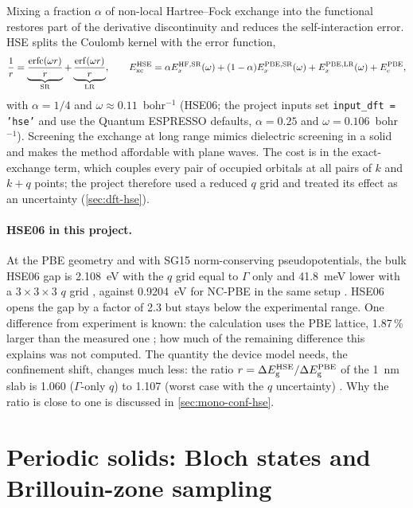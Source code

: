 Mixing a fraction $\alpha$ of non-local Hartree--Fock exchange into the functional restores part of the derivative
discontinuity and reduces the self-interaction error. HSE \citep{Heyd2003,Heyd2006,Krukau2006} splits the Coulomb
kernel with the error function,
\begin{equation}
\frac{1}{r} = \underbrace{\frac{\mathrm{erfc}(\omega r)}{r}}_{\mathrm{SR}} + \underbrace{\frac{\mathrm{erf}(\omega r)}{r}}_{\mathrm{LR}},\qquad
E_{\mathrm{xc}}^{\mathrm{HSE}} = \alpha E_x^{\mathrm{HF,SR}}(\omega) + (1-\alpha)E_x^{\mathrm{PBE,SR}}(\omega) + E_x^{\mathrm{PBE,LR}}(\omega) + E_c^{\mathrm{PBE}},
\label{eq:mono-dft-hse}
\end{equation}
with $\alpha = 1/4$ and $\omega \approx 0.11$~bohr$^{-1}$ (HSE06; the project inputs set \texttt{input\_dft = 'hse'} and
use the Quantum ESPRESSO defaults, $\alpha = 0.25$ and $\omega = 0.106$~bohr$^{-1}$). Screening the exchange at long range mimics dielectric
screening in a solid and makes the method affordable with plane waves. The cost is in the exact-exchange term, which
couples every pair of occupied orbitals at all pairs of $k$ and $k+q$ points; the project therefore used a reduced $q$
grid and treated its effect as an uncertainty (\cref{sec:dft-hse}).

\paragraph{HSE06 in this project.} At the PBE geometry and with SG15 norm-conserving pseudopotentials, the bulk HSE06
gap is 2.108~eV with the $q$ grid equal to $\Gamma$ only and 41.8~meV lower with a $3\times3\times3$ $q$ grid
, against 0.9204~eV for NC-PBE in the same setup . HSE06 opens the gap by a factor of 2.3 but stays
below the experimental range. One difference from experiment is known: the calculation uses the PBE lattice, 1.87\,\%
larger than the measured one ; how much of the remaining difference this explains was not computed. The quantity the device model needs,
the confinement shift, changes much less: the ratio $r = \Delta E_{\mathrm{g}}^{\mathrm{HSE}}/\Delta E_{\mathrm{g}}^{\mathrm{PBE}}$ of the 1~nm
slab is 1.060 ($\Gamma$-only $q$) to 1.107 (worst case with the $q$ uncertainty) . Why the ratio is close to
one is discussed in \cref{sec:mono-conf-hse}.

\section{Periodic solids: Bloch states and Brillouin-zone sampling}
\label{sec:mono-dft-bloch}

